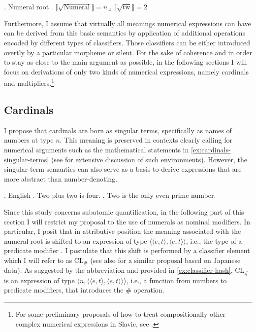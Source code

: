 	\ex. Numeral root\label{ex:numeral-root}
	\a. $\llbracket \sqrt{\text{Numeral}}\rrbracket = n$\label{ex:numeral-root-general}
	\b. $\llbracket \sqrt{\text{tw}}\rrbracket = 2$\label{ex:numeral-root-tw}
	
	Furthermore, I assume that virtually all meanings numerical expressions can have can be derived from this basic semantics by application of additional operations encoded by different types of classifiers. Those classifiers can be either introduced overtly by a particular morpheme or silent. For the sake of coherence and in order to stay as close to the main argument as possible, in the following sections I will focus on derivations of only two kinds of numerical expressions, namely cardinals and multipliers.\footnote{For some preliminary proposals of how to treat compositionally other complex numerical expressions in Slavic, see \citet{wagiel2015sums,wagiel2020entities,wagiel2020several}.}
	
	\subsection{Cardinals}\label{sec:cardinals}
	
	I propose that cardinals are born as singular terms, specifically as names of numbers at type $n$. This meaning is preserved in contexts clearly calling for numerical arguments such as the mathematical statements in \ref{ex:cardinals-singular-terms} (see \citealt{rothstein2017semantics} for extensive discussion of such environments). However, the singular term semantics can also serve as a basis to derive expressions that are more abstract than number-denoting.  
	
	\ex. English \citep{rothstein2013fregean}\label{ex:cardinals-singular-terms}
	\a. Two plus two is four.
	\b. Two is the only even prime number.
	
	Since this study concerns subatomic quantification, in the following part of this section I will restrict my proposal to the use of numerals as nominal modifiers. In particular, I posit that in attributive position the meaning associated with the numeral root is shifted to an expression of type $\langle\langle e,t\rangle,\langle e,t\rangle\rangle$, i.e., the type of a predicate modifier \citep[see][]{ionin_matushansky2006composition}. I postulate that this shift is performed by a classifier element which I will refer to as CL$_\#$ (see also \citealt{sudo2016semantic} for a similar proposal based on Japanese data). As suggested by the abbreviation and provided in \ref{ex:classifier-hash}, CL$_\#$ is an expression of type $\langle n,\langle\langle e,t\rangle,\langle e,t\rangle\rangle\rangle$, i.e., a function from numbers to predicate modifiers, that introduces the $\#$ operation. 
	
